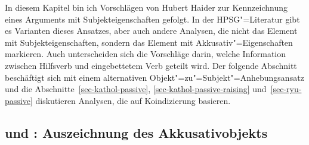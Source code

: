 {%


In diesem Kapitel bin ich Vorschlägen von Hubert Haider zur Kennzeichnung eines Arguments 
mit Subjekteigenschaften gefolgt. In der HPSG"=Literatur gibt es Varianten dieses Ansatzes,
aber auch andere Analysen, die nicht das Element mit Subjekteigenschaften, sondern
das Element mit Akkusativ"=Eigenschaften markieren. Auch unterscheiden sich die Vorschläge
darin, welche Information zwischen Hilfsverb und eingebettetem Verb geteilt wird.
Der folgende Abschnitt beschäftigt sich mit einem alternativen Objekt"=zu"=Subjekt"=Anhebungsansatz
und die Abschnitte~\ref{sec-kathol-passive}, \ref{sec-kathol-passive-raising} und~\ref{sec-ryu-passive} diskutieren 
Analysen, die auf Koindizierung basieren.




\subsection{ und : Auszeichnung des Akkusativobjekts}
\label{kathol-pollard}\label{Abschnitt-Kathol-Pollard-ERG-Merkmal}




}
